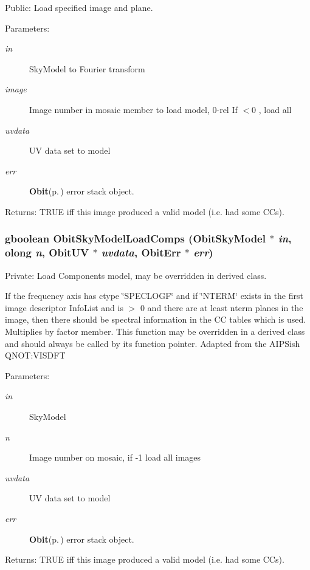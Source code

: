 Public: Load specified image and plane. 

\begin{Desc}
\item[Parameters:]
\begin{description}
\item[{\em in}]Sky\-Model to Fourier transform \item[{\em image}]Image number in mosaic member to load model, 0-rel If $<$0 , load all \item[{\em uvdata}]UV data set to model \item[{\em err}]{\bf Obit}{\rm (p.\,\pageref{structObit})} error stack object. \end{description}
\end{Desc}
\begin{Desc}
\item[Returns:]TRUE iff this image produced a valid model (i.e. had some CCs). \end{Desc}
\subsubsection{\setlength{\rightskip}{0pt plus 5cm}gboolean Obit\-Sky\-Model\-Load\-Comps ({\bf Obit\-Sky\-Model} $\ast$ {\em in}, {\bf olong} {\em n}, {\bf Obit\-UV} $\ast$ {\em uvdata}, {\bf Obit\-Err} $\ast$ {\em err})}\label{ObitSkyModel_8c_a10}


Private: Load Components model, may be overridden in derived class. 

If the frequency axis has ctype \char`\"{}SPECLOGF\char`\"{} and if \char`\"{}NTERM\char`\"{} exists in the first image descriptor Info\-List and is $>$ 0 and there are at least nterm planes in the image, then there should be spectral information in the CC tables which is used. Multiplies by factor member. This function may be overridden in a derived class and should always be called by its function pointer. Adapted from the AIPSish QNOT:VISDFT \begin{Desc}
\item[Parameters:]
\begin{description}
\item[{\em in}]Sky\-Model \item[{\em n}]Image number on mosaic, if -1 load all images \item[{\em uvdata}]UV data set to model \item[{\em err}]{\bf Obit}{\rm (p.\,\pageref{structObit})} error stack object. \end{description}
\end{Desc}
\begin{Desc}
\item[Returns:]TRUE iff this image produced a valid model (i.e. had some CCs). \end{Desc}
